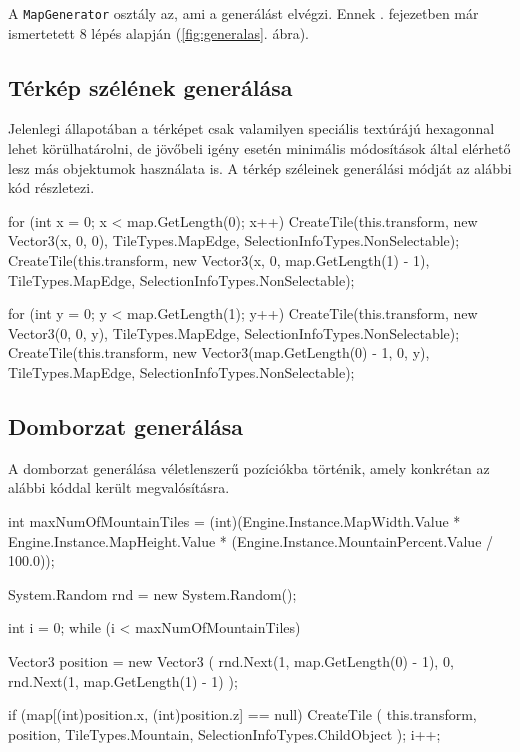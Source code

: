 A \texttt{MapGenerator} osztály az, ami a generálást elvégzi. Ennek . fejezetben már ismertetett 8 lépés alapján (\ref{fig:generalas}. ábra).

\subsection{Térkép szélének generálása}

Jelenlegi állapotában a térképet csak valamilyen speciális textúrájú hexagonnal lehet körülhatárolni, de jövőbeli igény esetén minimális módosítások által elérhető lesz más objektumok használata is. A térkép széleinek generálási módját az alábbi kód részletezi.
\begin{cpp}
for (int x = 0; x < map.GetLength(0); x++)
{
   CreateTile(this.transform, new Vector3(x, 0, 0),
   TileTypes.MapEdge, SelectionInfoTypes.NonSelectable);
   CreateTile(this.transform, new Vector3(x, 0, map.GetLength(1) - 1),
   TileTypes.MapEdge, SelectionInfoTypes.NonSelectable);
}

for (int y = 0; y < map.GetLength(1); y++)
{
   CreateTile(this.transform, new Vector3(0, 0, y),
   TileTypes.MapEdge, SelectionInfoTypes.NonSelectable);
   CreateTile(this.transform, new Vector3(map.GetLength(0) - 1, 0, y),
   TileTypes.MapEdge, SelectionInfoTypes.NonSelectable);
}
\end{cpp}

\subsection{Domborzat generálása}

A domborzat generálása véletlenszerű pozíciókba történik, amely konkrétan az alábbi kóddal került megvalósításra.
\begin{cpp}
int maxNumOfMountainTiles = 
(int)(Engine.Instance.MapWidth.Value * Engine.Instance.MapHeight.Value * 
(Engine.Instance.MountainPercent.Value / 100.0));

System.Random rnd = new System.Random();

int i = 0;
while (i < maxNumOfMountainTiles)
{
   Vector3 position = new Vector3
   (
      rnd.Next(1, map.GetLength(0) - 1),
      0, rnd.Next(1, map.GetLength(1) - 1)
   );

   if (map[(int)position.x, (int)position.z] == null)
   {
      CreateTile
      (
         this.transform, position, TileTypes.Mountain, 
         SelectionInfoTypes.ChildObject
      );
      i++;
   }
}
\end{cpp}

